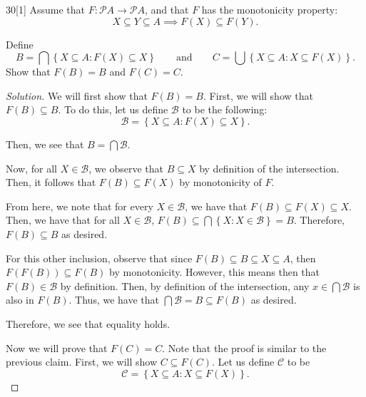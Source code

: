 \documentclass{article}
\newenvironment{solution}{\begin{proof}[Solution]}{\end{proof}}
\renewcommand\qedsymbol{$\blacksquare$}
\newenvironment{innerproof}{\renewcommand{\qedsymbol}{$\square$}\proof}{\endproof}
\newcommand{\brc}[1]{ \left\{  {#1} \right\}}
\begin{document}
	\begin{hw}{30}[1]
		Assume that $F : \mathscr{P}A \rightarrow \mathscr{P}A$, and that $F$ has the monotonicity property:
		\begin{equation*}
			X \subseteq Y \subseteq A \implies F(X) \subseteq F(Y).
		\end{equation*}
		
		Define
		\begin{equation*}
			B = \bigcap \brc{X \subseteq A : F(X) \subseteq X} \qquad \text{and} \qquad C = \bigcup \brc{X \subseteq A : X \subseteq F(X)}.
		\end{equation*}
		Show that $F(B) = B$ and $F(C) = C$.
	\end{hw}
	\begin{solution}
		We will first show that $F(B) = B$.
		\begin{innerproof}
			First, we will show that $F(B) \subseteq B$. To do this, let us define $\mathcal B$ to be the following:
			\begin{equation*}
				\mathcal B = \brc{X \subseteq A : F(X) \subseteq X}.
			\end{equation*}
		
			Then, we see that $B = \bigcap \mathcal B$.
			
			Now, for all $X \in \mathcal B$, we observe that $B \subseteq X$ by definition of the intersection. Then, it follows that $F(B) \subseteq F(X)$ by monotonicity of $F$.
			
			From here, we note that for every $X \in \mathcal B$, we have that $F(B) \subseteq F(X) \subseteq X$. Then, we have that for all $X \in \mathcal B$, $F(B) \subseteq \bigcap \brc{X : X \in \mathcal B} = B$. Therefore, $F(B) \subseteq B$ as desired.
			
			For this other inclusion, observe that since $F(B) \subseteq B \subseteq X \subseteq A$, then $F(F(B)) \subseteq F(B)$ by monotonicity. However, this means then that $F(B) \in \mathcal B$ by definition. Then, by definition of the intersection, any $x \in \bigcap \mathcal B$ is also in $F(B)$. Thus, we have that $\bigcap \mathcal B = B \subseteq F(B)$ as desired.
			
			Therefore, we see that equality holds.
		\end{innerproof}
	
		Now we will prove that $F(C) = C$. Note that the proof is similar to the previous claim.
		\begin{innerproof}
			First, we will show $C \subseteq F(C)$. Let us define $\mathcal C$ to be
			\begin{equation*}
				\mathcal C = \brc{X \subseteq A : X \subseteq F(X)}.
			\end{equation*}
			

\end{innerproof}
\end{solution}
\end{document}
